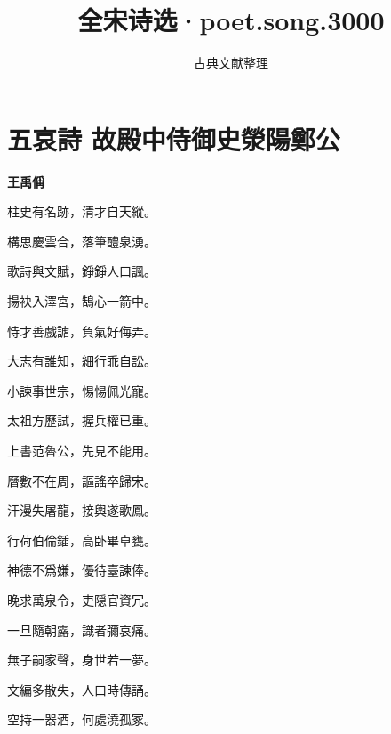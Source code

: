 \documentclass[12pt,a4paper]{ctexbook}
\title{全宋诗选·poet.song.3000}
\author{古典文献整理}
\date{}
\begin{document}
\maketitle
\tableofcontents
\newpage
\section{五哀詩 故殿中侍御史滎陽鄭公}
\textbf{王禹偁}\par\vspace{0.5em}
柱史有名跡，清才自天縱。\par
構思慶雲合，落筆醴泉湧。\par
歌詩與文賦，錚錚人口諷。\par
揚袂入澤宮，鵠心一箭中。\par
恃才善戲謔，負氣好侮弄。\par
大志有誰知，細行乖自訟。\par
小諫事世宗，惕惕佩光寵。\par
太祖方歷試，握兵權已重。\par
上書范魯公，先見不能用。\par
曆數不在周，謳謠卒歸宋。\par
汗漫失屠龍，接輿遂歌鳳。\par
行荷伯倫鍤，高卧畢卓甕。\par
神德不爲嫌，優待臺諫俸。\par
晚求萬泉令，吏隠官資冗。\par
一旦隨朝露，識者彌哀痛。\par
無子嗣家聲，身世若一夢。\par
文編多散失，人口時傳誦。\par
空持一器酒，何處澆孤冢。\par
\end{document}
